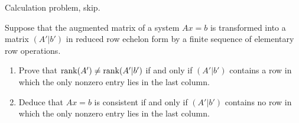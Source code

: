 \begin{exercise} \label{exercise 3.4.2}
Calculation problem, skip.
\end{exercise}

\begin{exercise} \label{exercise 3.4.3}
Suppose that the augmented matrix of a system \(Ax = b\) is transformed into a matrix \((A'|b')\) in reduced row echelon form by a finite sequence of elementary row operations.
\begin{enumerate}
\item Prove that \(\mathrm{rank}(A') \ne \mathrm{rank}(A'|b')\) if and only if \((A'|b')\) contains a row in which the only nonzero entry lies in the last column.

\item Deduce that \(Ax = b\) is consistent if and only if \((A'|b')\) contains no row in which the only nonzero entry lies in the last column.
\end{enumerate}
\end{exercise}

